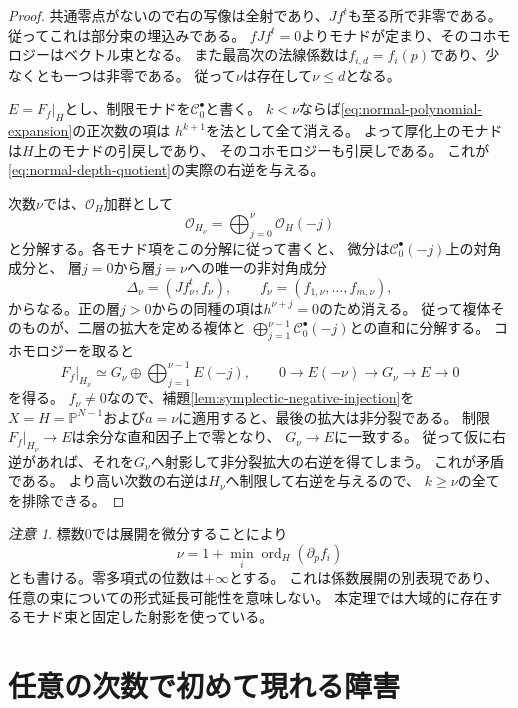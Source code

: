 \documentclass[a4paper,11pt]{ltjsarticle}
\numberwithin{equation}{section}
\theoremstyle{plain}
\theoremstyle{definition}
\theoremstyle{remark}
\newtheorem{remark}[theorem]{注意}
\begin{document}
\begin{proof}
共通零点がないので右の写像は全射であり、$Jf^t$も至る所で非零である。
従ってこれは部分束の埋込みである。
$fJf^t=0$よりモナドが定まり、そのコホモロジーはベクトル束となる。
また最高次の法線係数は$f_{i,d}=f_i(p)$であり、少なくとも一つは非零である。
従って$\nu$は存在して$\nu\leq d$となる。

$E=F_f|_H$とし、制限モナドを$\mathcal C_0^\bullet$と書く。
$k<\nu$ならば\eqref{eq:normal-polynomial-expansion}の正次数の項は
$h^{k+1}$を法として全て消える。
よって厚化上のモナドは$H$上のモナドの引戻しであり、
そのコホモロジーも引戻しである。
これが\eqref{eq:normal-depth-quotient}の実際の右逆を与える。

次数$\nu$では、$\mathcal O_H$加群として
\[
 \mathcal O_{H_\nu}=\bigoplus_{j=0}^{\nu}\mathcal O_H(-j)
\]
と分解する。各モナド項をこの分解に従って書くと、
微分は$\mathcal C_0^\bullet(-j)$上の対角成分と、
層$j=0$から層$j=\nu$への唯一の非対角成分
\[
 \Delta_\nu=(Jf_\nu^t,f_\nu),
 \qquad f_\nu=(f_{1,\nu},\ldots,f_{m,\nu}),
\]
からなる。正の層$j>0$からの同種の項は$h^{\nu+j}=0$のため消える。
従って複体そのものが、二層の拡大を定める複体と
$\bigoplus_{j=1}^{\nu-1}\mathcal C_0^\bullet(-j)$との直和に分解する。
コホモロジーを取ると
\[
 F_f|_{H_\nu}\simeq G_\nu\oplus
                \bigoplus_{j=1}^{\nu-1}E(-j),
 \qquad
 0\longrightarrow E(-\nu)\longrightarrow G_\nu
 \longrightarrow E\longrightarrow0
\]
を得る。
$f_\nu\ne0$なので、補題\ref{lem:symplectic-negative-injection}を
$X=H=\mathbb P^{N-1}$および$a=\nu$に適用すると、最後の拡大は非分裂である。
制限$F_f|_{H_\nu}\to E$は余分な直和因子上で零となり、
$G_\nu\to E$に一致する。
従って仮に右逆があれば、それを$G_\nu$へ射影して非分裂拡大の右逆を得てしまう。
これが矛盾である。
より高い次数の右逆は$H_\nu$へ制限して右逆を与えるので、
$k\geq\nu$の全てを排除できる。
\end{proof}

\begin{remark}
\label{rem:normal-derivative-order}
標数$0$では展開を微分することにより
\[
 \nu=1+\min_i\operatorname{ord}_H(\partial_p f_i)
\]
とも書ける。零多項式の位数は$+\infty$とする。
これは係数展開の別表現であり、任意の束についての形式延長可能性を意味しない。
本定理では大域的に存在するモナド束と固定した射影を使っている。
\end{remark}


\section{任意の次数で初めて現れる障害}
\end{document}
